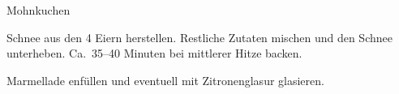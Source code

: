 \begin{recipe}{Mohnkuchen}

    \begin{ingredients}
    \end{ingredients}

    \begin{instructions}
        Schnee aus den 4 Eiern herstellen.
        Restliche Zutaten mischen und den Schnee unterheben.
        Ca.\ 35--40 Minuten bei mittlerer Hitze backen.

        Marmellade enfüllen und eventuell mit Zitronenglasur glasieren.
    \end{instructions}
\end{recipe}
